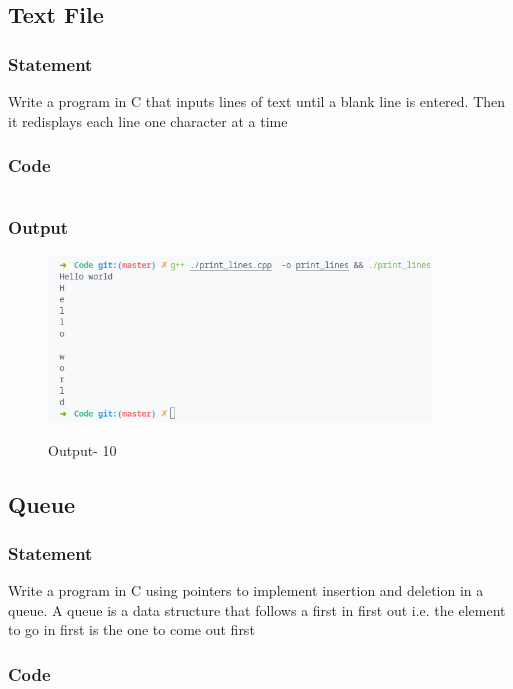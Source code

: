 \pagebreak
\subsection{Text File}
\subsubsection{Statement}
Write a program in C that inputs lines of text until a blank line is entered. Then it redisplays
each line one character at a time
\subsubsection{Code}
\inputminted[]{c}{../Code/print_lines.cpp}
\subsubsection{Output}
\begin{figure}[!htb]
  \centering
  \includegraphics[width=4in]{Images/print_lines.png}
  \label{Output-10}
  \caption{Output- 10}
\end{figure}

\pagebreak
\subsection{Queue}
\subsubsection{Statement}
Write a program in C using pointers to implement insertion and deletion in a queue. A queue
is a data structure that follows a first in first out i.e. the element to go in first is the one to come
out first
\subsubsection{Code}
\inputminted[]{c}{../Code/q.cpp}
\pagebreak
